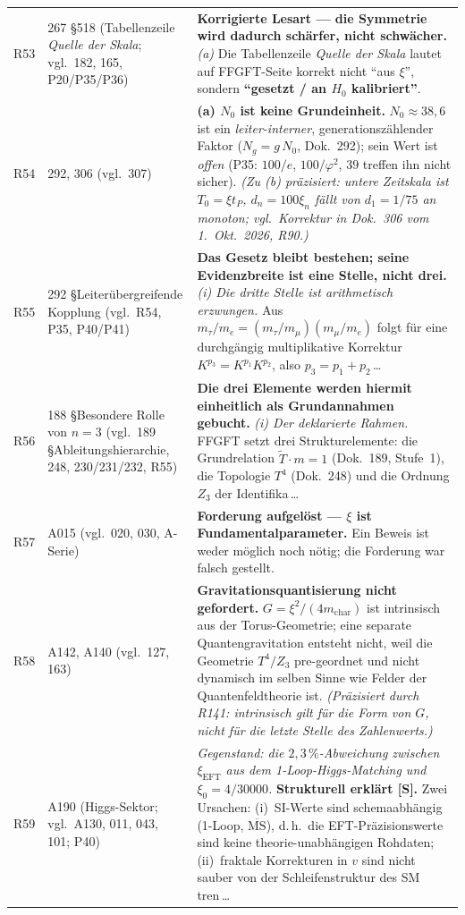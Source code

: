 \begin{longtable}{@{}p{0.9cm}p{3.1cm}p{10.2cm}@{}}
R53 & 267 \S518 (Tabellenzeile \emph{Quelle der Skala}; vgl.\ 182, 165, P20/P35/P36) & \textbf{Korrigierte Lesart --- die Symmetrie wird dadurch schärfer, nicht schwächer.} \emph{(a)} Die Tabellenzeile \emph{Quelle der Skala} lautet auf FFGFT-Seite korrekt nicht \enquote{aus $\xi$}, sondern \textbf{\enquote{gesetzt / an $H_0$ kalibriert}}. \\
R54 & 292, 306 (vgl.\ 307) & \textbf{(a) $N_0$ ist keine Grundeinheit.} $N_0\approx38{,}6$ ist ein \emph{leiter-interner}, generationszählender Faktor ($N_g=g\,N_0$, Dok.~292); sein Wert ist \emph{offen} (P35: $100/e$, $100/\varphi^2$, $39$ treffen ihn nicht sicher). \emph{(Zu (b) präzisiert: untere Zeitskala ist $T_0=\xi t_P$, $d_n=100\xi_n$ fällt von $d_1=1/75$ an monoton; vgl.\ Korrektur in Dok.~306 vom 1.~Okt.~2026, R90.)} \\
R55 & 292 \S{}Leiterübergreifende Kopplung (vgl.\ R54, P35, P40/P41) & \textbf{Das Gesetz bleibt bestehen; seine Evidenzbreite ist eine Stelle, nicht drei.} \emph{(i) Die dritte Stelle ist arithmetisch erzwungen.} Aus $m_\tau/m_e=(m_\tau/m_\mu)(m_\mu/m_e)$ folgt für eine durchgängig multiplikative Korrektur $K^{p_3}=K^{p_1}K^{p_2}$, also $p_3=p_1+p_2$\,\ldots \\
R56 & 188 \S{}Besondere Rolle von $n=3$ (vgl.\ 189 \S{}Ableitungshierarchie, 248, 230/231/232, R55) & \textbf{Die drei Elemente werden hiermit einheitlich als Grundannahmen gebucht.} \emph{(i) Der deklarierte Rahmen.} FFGFT setzt drei Strukturelemente: die Grundrelation $\tilde{T}\cdot m = 1$ (Dok.~189, Stufe~1), die Topologie $T^4$ (Dok.~248) und die Ordnung $Z_3$ der Identifika\,\ldots \\
R57 & A015 (vgl.\ 020, 030, A-Serie) & \textbf{Forderung aufgelöst --- $\xi$ ist Fundamentalparameter.} Ein Beweis ist weder möglich noch nötig; die Forderung war falsch gestellt. \\
R58 & A142, A140 (vgl.\ 127, 163) & \textbf{Gravitationsquantisierung nicht gefordert.} $G=\xi^2/(4m_\text{char})$ ist intrinsisch aus der Torus-Geometrie; eine separate Quantengravitation entsteht nicht, weil die Geometrie $T^4/Z_3$ pre-geordnet und nicht dynamisch im selben Sinne wie Felder der Quantenfeldtheorie ist. \emph{(Präzisiert durch R141: intrinsisch gilt für die Form von $G$, nicht für die letzte Stelle des Zahlenwerts.)} \\
R59 & A190 (Higgs-Sektor; vgl.\ A130, 011, 043, 101; P40) & \emph{Gegenstand: die $2{,}3\,\%$-Abweichung zwischen $\xi_{\mathrm{EFT}}$ aus dem 1-Loop-Higgs-Matching und $\xi_0=4/30000$.} \textbf{Strukturell erklärt [S].} Zwei Ursachen: (i)~SI-Werte sind schemaabhängig (1-Loop, $\overline{\mathrm{MS}}$), d.\,h.\ die EFT-Präzisionswerte sind keine theorie-unabhängigen Rohdaten; (ii)~fraktale Korrekturen in $v$ sind nicht sauber von der Schleifenstruktur des SM tren\,\ldots \\

\end{longtable}
